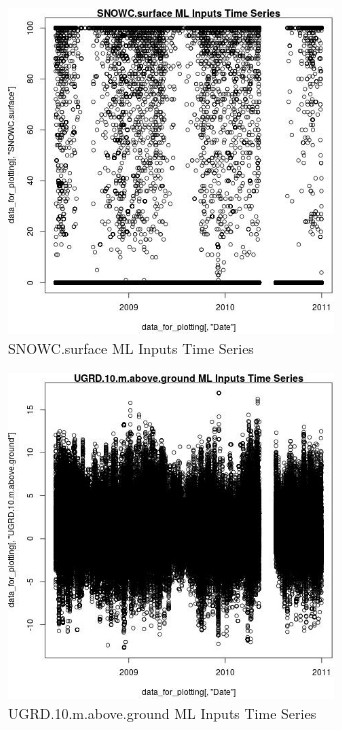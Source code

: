 \begin{figure} 
\centering  
\includegraphics[width=0.77\textwidth]{Code_Outputs/ML_input_report_ML_input_PM25_Step5_part_d_de_duplicated_aves_ML_input_SNOWCsurfacevDate.jpg} 
\caption{\label{fig:ML_input_report_ML_input_PM25_Step5_part_d_de_duplicated_aves_ML_inputSNOWCsurfacevDate}SNOWC.surface ML Inputs Time Series} 
\end{figure} 
 

\begin{figure} 
\centering  
\includegraphics[width=0.77\textwidth]{Code_Outputs/ML_input_report_ML_input_PM25_Step5_part_d_de_duplicated_aves_ML_input_UGRD10mabovegroundvDate.jpg} 
\caption{\label{fig:ML_input_report_ML_input_PM25_Step5_part_d_de_duplicated_aves_ML_inputUGRD10mabovegroundvDate}UGRD.10.m.above.ground ML Inputs Time Series} 
\end{figure} 
 

